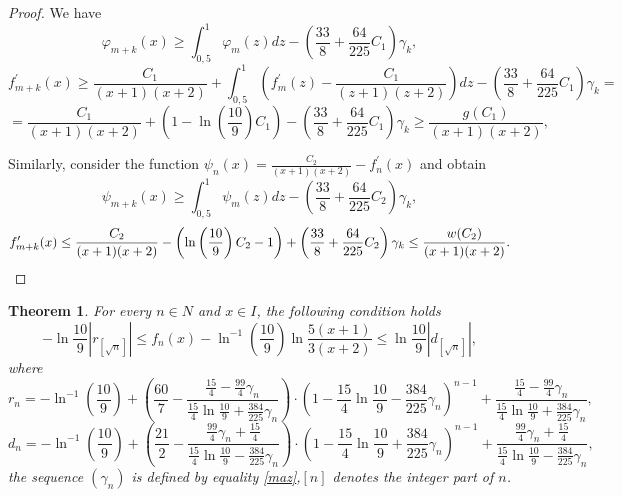 \documentclass[11pt]{amsart}
\theoremstyle{plain}
\newtheorem{theorem}{Theorem}
\theoremstyle{remark}
\begin{document}
\begin{proof}
We have
$$
\varphi_{m+k}(x)\geq\int_{0,5}^{1}\varphi_m(z)dz-\left(\frac{33}{8}+\frac{64}{225}C_1\right)\gamma_k,
$$
$$
f_{m+k}^\prime(x)\geq\frac{C_1}{(x+1)(x+2)}+\int_{0,5}^{1}\left(f_m^\prime(z)-\frac{C_1}{(z+1)(z+2)}\right)dz-\left(\frac{33}{8}+\frac{64}{225}C_1\right)\gamma_{k}=
$$
$$
=\frac{C_1}{(x+1)(x+2)}+\left(1-\ln\left(\frac{10}{9}\right)C_1\right)-\left(\frac{33}{8}+\frac{64}{225}C_1\right)\gamma_k\geq\frac{g(C_1)}{(x+1)(x+2)},
$$

Similarly, consider the function $\psi_n(x)=\frac{C_2}{(x+1)(x+2)}-f_n^\prime(x)$
and obtain
$$
\psi_{m+k}(x)\geq\int_{0,5}^{1}\psi_m(z)dz-\left(\frac{33}{8}+\frac{64}{225}C_2\right)\gamma_{k},
$$
\[
f_{m+k}^\prime(x)\leq\frac{C_2}{(x+1)(x+2)}-\left(\ln \left(\frac{10}{9}\right)C_2-1\right)+\left(\frac{33}{8}+\frac{64}{225}C_2\right)\gamma_k\leq\frac{w(C_2)}{(x+1)(x+2)}.
\qedhere\]
\end{proof}
\begin{theorem}
For every $n\in N$ and $x\in I$, the following condition holds
\begin{equation}\label{mr}
  -\ln\frac{10}{9}|r_{[\sqrt{n}]}|\leq f_n(x)-\ln^{-1}\left(\frac{10}{9}\right)\ln\frac{5(x+1)}{3(x+2)}
\leq\ln\frac{10}{9}|d_{[\sqrt{n}]}|,
\end{equation}
where
$$
r_{n}=-\ln^{-1}\left(\frac{10}{9}\right)+\left(\frac{60}{7}-\frac{\frac{15}{4}-\frac{99}{4}\gamma_n}
{\frac{15}{4}\ln\frac{10}{9}+\frac{384}{225}\gamma_n}\right)\cdot \left(1-\frac{15}{4}\ln\frac{10}{9}-\frac{384}{225}\gamma_n\right)^{n-1}+
\frac{\frac{15}{4}-\frac{99}{4}\gamma_n}{\frac{15}{4}\ln\frac{10}{9}+\frac{384}{225}\gamma_n},
$$
$$
d_{n}=-\ln^{-1}\left(\frac{10}{9}\right)+\left(\frac{21}{2}-\frac{\frac{99}{4}\gamma_n+\frac{15}{4}}
{\frac{15}{4}\ln\frac{10}{9}-\frac{384}{225}\gamma_n}\right)\cdot \left(1-\frac{15}{4}\ln\frac{10}{9}+\frac{384}{225}\gamma_n\right)^{n-1}+
 \frac{\frac{99}{4}\gamma_{n}+\frac{15}{4}}{\frac{15}{4}\ln\frac{10}{9}-\frac{384}{225}\gamma_n},
$$
the sequence $(\gamma_{n})$ is defined by equality \eqref{maz},$[n]$ denotes the integer part of $n$.
\end{theorem}
\end{document}

